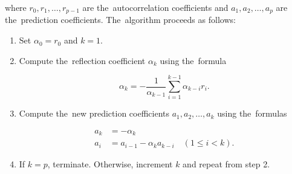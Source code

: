 where $r_0, r_1, \ldots, r_{p-1}$ are the~autocorrelation coefficients and $a_1, a_2, \ldots, a_p$ are the~prediction coefficients. The~algorithm proceeds as follows:\\

\begin{enumerate}
    \item Set $\alpha_0 = r_0$ and $k = 1$.
    \item Compute the~reflection coefficient $\alpha_k$ using the~formula

    \begin{equation*}
        \alpha_k = -\frac{1}{\alpha_{k-1}} \sum_{i=1}^{k-1} \alpha_{k-i} r_i.
    \end{equation*}

    \item Compute the~new prediction coefficients $a_1, a_2, \ldots, a_k$ using the~formulas

    \begin{align*}
        a_k &= -\alpha_k \\
        a_i &= a_{i-1} - \alpha_k a_{k-i} \quad (1 \leq i < k).
    \end{align*}

    \item If $k = p$, terminate. Otherwise, increment $k$ and repeat from step 2.
\end{enumerate}


